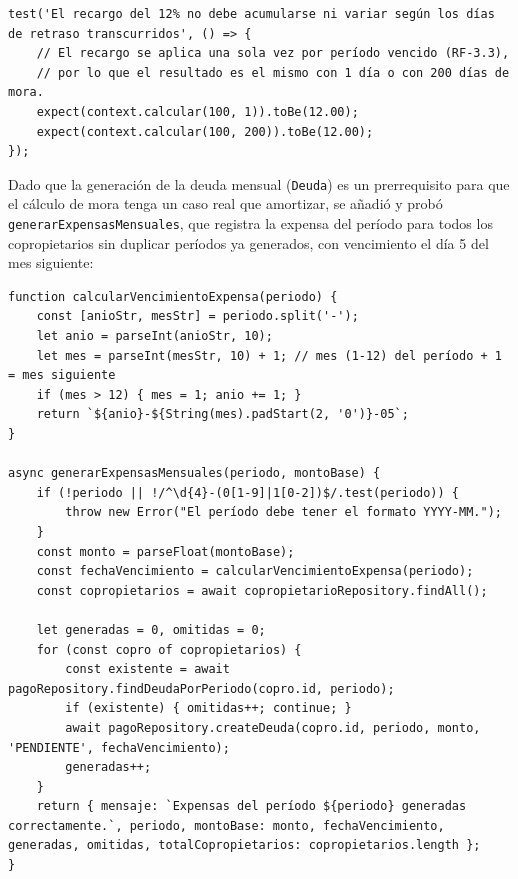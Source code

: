 \documentclass[12pt,a4paper]{article}
\begin{document}
\begin{lstlisting}[caption={Prueba de invariancia del recargo respecto a los días de atraso (\texttt{moraStrategy.test.js})}]
test('El recargo del 12% no debe acumularse ni variar según los días de retraso transcurridos', () => {
    // El recargo se aplica una sola vez por período vencido (RF-3.3),
    // por lo que el resultado es el mismo con 1 día o con 200 días de mora.
    expect(context.calcular(100, 1)).toBe(12.00);
    expect(context.calcular(100, 200)).toBe(12.00);
});
\end{lstlisting}

Dado que la generación de la deuda mensual (\texttt{Deuda}) es un prerrequisito para que
el cálculo de mora tenga un caso real que amortizar, se añadió y probó
\texttt{generarExpensasMensuales}, que registra la expensa del período para todos los
copropietarios sin duplicar períodos ya generados, con vencimiento el día 5 del mes
siguiente:

\begin{lstlisting}[caption={\texttt{generarExpensasMensuales} (\texttt{PagoService.js})}]
function calcularVencimientoExpensa(periodo) {
    const [anioStr, mesStr] = periodo.split('-');
    let anio = parseInt(anioStr, 10);
    let mes = parseInt(mesStr, 10) + 1; // mes (1-12) del período + 1 = mes siguiente
    if (mes > 12) { mes = 1; anio += 1; }
    return `${anio}-${String(mes).padStart(2, '0')}-05`;
}

async generarExpensasMensuales(periodo, montoBase) {
    if (!periodo || !/^\d{4}-(0[1-9]|1[0-2])$/.test(periodo)) {
        throw new Error("El período debe tener el formato YYYY-MM.");
    }
    const monto = parseFloat(montoBase);
    const fechaVencimiento = calcularVencimientoExpensa(periodo);
    const copropietarios = await copropietarioRepository.findAll();

    let generadas = 0, omitidas = 0;
    for (const copro of copropietarios) {
        const existente = await pagoRepository.findDeudaPorPeriodo(copro.id, periodo);
        if (existente) { omitidas++; continue; }
        await pagoRepository.createDeuda(copro.id, periodo, monto, 'PENDIENTE', fechaVencimiento);
        generadas++;
    }
    return { mensaje: `Expensas del período ${periodo} generadas correctamente.`, periodo, montoBase: monto, fechaVencimiento, generadas, omitidas, totalCopropietarios: copropietarios.length };
}
\end{lstlisting}
\end{document}
